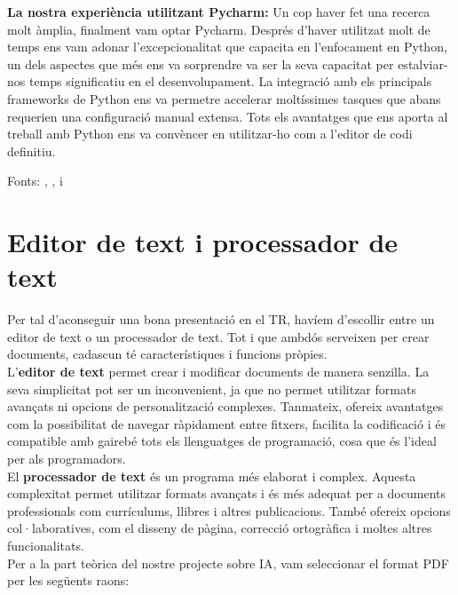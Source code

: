 \textbf{La nostra experiència utilitzant Pycharm:}
Un cop haver fet una recerca molt àmplia, finalment vam optar Pycharm. Després d'haver utilitzat molt de temps ens vam adonar l'excepcionalitat que capacita en l'enfocament en Python, un dels aspectes que més ens va sorprendre va ser la seva capacitat per estalviar-nos temps significatiu en el desenvolupament. La integració amb els principals frameworks de Python ens va permetre accelerar moltíssimes tasques que abans requerien una configuració manual extensa.  Tots els avantatges que ens aporta al treball amb Python ens va convèncer en utilitzar-ho com a l'editor de codi definitiu.



Fonts: \cite{VSCodeilessevesavantatges}, \cite{FundacioEclipse}, \cite{Totl'hoquehasdesaberdelPycharm} i~\cite{ToteslesnovetatsdePycharm}



\section{Editor de text i processador de text}\label{sec:4.2}

Per tal d'aconseguir una bona presentació en el TR, havíem d’escollir entre un editor de text o un processador de text. Tot i que ambdós serveixen per crear documents, cadascun té característiques i funcions pròpies.\\

L’\textbf{editor de text} permet crear i modificar documents de manera senzilla. La seva simplicitat pot ser un inconvenient, ja que no permet utilitzar formats avançats ni opcions de personalització complexes. Tanmateix, ofereix avantatges com la possibilitat de navegar ràpidament entre fitxers, facilita la codificació i és compatible amb gairebé tots els llenguatges de programació, cosa que és l'ideal per als programadors.\\

El \textbf{processador de text} és un programa més elaborat i complex. Aquesta complexitat permet utilitzar formats avançats i és més adequat per a documents professionals com currículums, llibres i altres publicacions. També ofereix opcions col·laboratives, com el disseny de pàgina, correcció ortogràfica i moltes altres funcionalitats.\\
Per a la part teòrica del nostre projecte sobre IA, vam seleccionar el format PDF per les següents raons:


